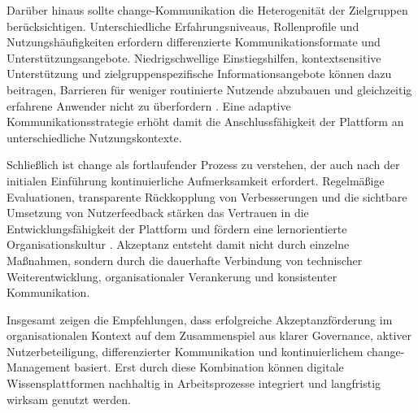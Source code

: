 Darüber hinaus sollte \Gls{change}-Kommunikation die Heterogenität der Zielgruppen berücksichtigen. Unterschiedliche Erfahrungsniveaus, Rollenprofile und Nutzungshäufigkeiten erfordern differenzierte Kommunikationsformate und Unterstützungsangebote. Niedrigschwellige Einstiegshilfen, kontextsensitive Unterstützung und zielgruppenspezifische Informationsangebote können dazu beitragen, Barrieren für weniger routinierte Nutzende abzubauen und gleichzeitig erfahrene Anwender nicht zu überfordern \cite{113:NNGIntranetGuidelines,114:IntranetAdoption}. Eine adaptive Kommunikationsstrategie erhöht damit die Anschlussfähigkeit der Plattform an unterschiedliche Nutzungskontexte.

Schließlich ist \Gls{change} als fortlaufender Prozess zu verstehen, der auch nach der initialen Einführung kontinuierliche Aufmerksamkeit erfordert. Regelmäßige Evaluationen, transparente Rückkopplung von Verbesserungen und die sichtbare Umsetzung von Nutzerfeedback stärken das Vertrauen in die Entwicklungsfähigkeit der Plattform und fördern eine lernorientierte Organisationskultur \cite{417:Benyon2019,124:Triangulation2023}. Akzeptanz entsteht damit nicht durch einzelne Maßnahmen, sondern durch die dauerhafte Verbindung von technischer Weiterentwicklung, organisationaler Verankerung und konsistenter Kommunikation.

Insgesamt zeigen die Empfehlungen, dass erfolgreiche Akzeptanzförderung im organisationalen Kontext auf dem Zusammenspiel aus klarer Governance, aktiver Nutzerbeteiligung, differenzierter Kommunikation und kontinuierlichem \Gls{change}-Management basiert. Erst durch diese Kombination können digitale Wissensplattformen nachhaltig in Arbeitsprozesse integriert und langfristig wirksam genutzt werden.
